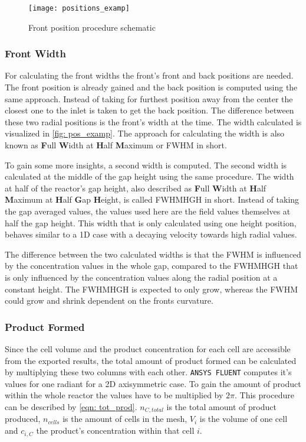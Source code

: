 \documentclass[../thesis.tex]{subfiles}
\begin{document}
\begin{figure}[htb]
	\centering
	\texttt{[image: positions\_examp]}
	\caption{Front position procedure schematic}
	\label{fig: pos_examp}
\end{figure}

\subsubsection{Front Width}

For calculating the front widths the front's front and back positions are needed. The front position is already gained and the back position is computed using the same approach. Instead of taking for furthest position away from the center the closest one to the inlet is taken to get the back position. The difference between these two radial positions is the front's width at the time. The width calculated is visualized in \autoref{fig: pos_examp}. The approach for calculating the width is also known as \textbf{F}ull \textbf{W}idth at \textbf{H}alf \textbf{M}aximum or FWHM in short.

To gain some more insights, a second width is computed. The second width is calculated at the middle of the gap height using the same procedure. The width at half of the reactor's gap height, also described as \textbf{F}ull \textbf{W}idth at \textbf{H}alf \textbf{M}aximum at \textbf{H}alf \textbf{G}ap \textbf{H}eight, is called FWHMHGH in short. Instead of taking the gap averaged values, the values used here are the field values themselves at half the gap height. This width that is only calculated using one height position, behaves similar to a 1D case with a decaying velocity towards high radial values.

The difference between the two calculated widths is that the FWHM is influenced by the concentration values in the whole gap, compared to the FWHMHGH that is only influenced by the concentration values along the radial position at a constant height. The FWHMHGH is expected to only grow, whereas the FWHM could grow and shrink dependent on the fronts curvature.

\subsubsection{Product Formed}

Since the cell volume and the product concentration for each cell are accessible from the exported results, the total amount of product formed can be calculated by multiplying these two columns with each other. \texttt{ANSYS FLUENT} computes it's values for one radiant for a 2D axisymmetric case. To gain the amount of product within the whole reactor the values have to be multiplied by $2 \pi$. This procedure can be described by \autoref{eqn: tot_prod}. $ n_{C, total} $ is the total amount of product produced, $n_{cells}$ is the amount of cells in the mesh, $ V_i $ is the volume of one cell and $c_{i, C}$ the product's concentration within that cell $i$.
\end{document}
